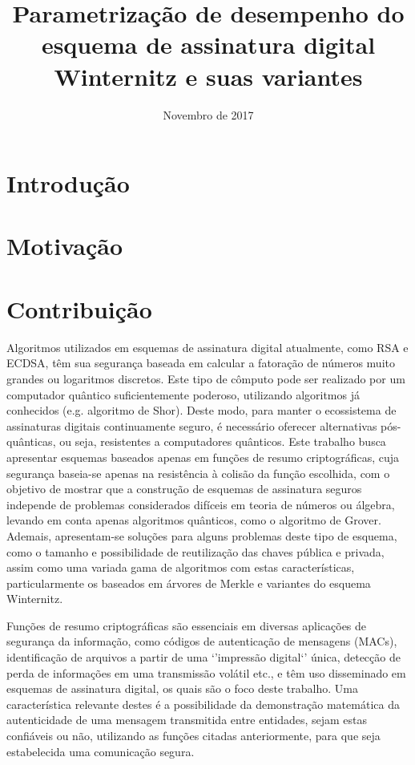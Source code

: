\documentclass{article}
\title{Parametrização de desempenho do esquema de
assinatura digital Winternitz e suas variantes}
\author{Novembro de 2017}
\date{}
\begin{document}
\maketitle

\section{Introdução}



\section{Motivação}

\section{Contribuição}

Algoritmos utilizados em esquemas de assinatura digital atualmente, como RSA
e ECDSA, têm sua segurança baseada em calcular a fatoração de números muito
grandes ou logaritmos discretos. Este tipo de cômputo pode ser realizado por
um computador quântico suficientemente poderoso, utilizando algoritmos já
conhecidos (e.g. algoritmo de Shor). Deste modo, para manter o ecossistema de
assinaturas digitais continuamente seguro, é necessário oferecer alternativas
pós-quânticas, ou seja, resistentes a computadores quânticos. Este trabalho
busca apresentar esquemas baseados apenas em funções de resumo
criptográficas, cuja segurança baseia-se apenas na resistência à colisão da
função escolhida, com o objetivo de mostrar que a construção de esquemas de
assinatura seguros independe de problemas considerados difíceis em teoria de
números ou álgebra, levando em conta apenas algoritmos quânticos, como o
algoritmo de Grover. Ademais, apresentam-se soluções para alguns problemas
deste tipo de esquema, como o tamanho e possibilidade de reutilização das
chaves pública e privada, assim como uma variada gama de algoritmos com estas
características, particularmente os baseados em árvores de Merkle e variantes
do esquema Winternitz.

Funções de resumo criptográficas são essenciais em diversas aplicações de
segurança da informação, como códigos de autenticação de mensagens (MACs),
identificação de arquivos a partir de uma `'impressão digital`' única, detecção
de perda de informações em uma transmissão volátil etc., e têm uso disseminado
em esquemas de assinatura digital, os quais são o foco deste trabalho. Uma
característica relevante destes é a possibilidade da demonstração matemática da
autenticidade de uma mensagem transmitida entre entidades, sejam estas
confiáveis ou não, utilizando as funções citadas anteriormente, para que seja
estabelecida uma comunicação segura.
\end{document}
